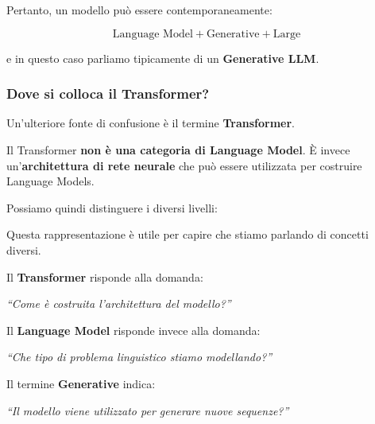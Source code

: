Pertanto, un modello può essere contemporaneamente:

\begin{equation}
\boxed{
\text{Language Model}
+
\text{Generative}
+
\text{Large}
}
\end{equation}

e in questo caso parliamo tipicamente di un \textbf{Generative LLM}.

\subsubsection{Dove si colloca il Transformer?}

Un'ulteriore fonte di confusione è il termine \textbf{Transformer}.

Il Transformer \textbf{non è una categoria di Language Model}. È invece un'\textbf{architettura di rete neurale} che può essere utilizzata per costruire Language Models.

Possiamo quindi distinguere i diversi livelli:

\begin{center}
\end{center}

Questa rappresentazione è utile per capire che stiamo parlando di concetti diversi.

Il \textbf{Transformer} risponde alla domanda:

\begin{center}
\textit{``Come è costruita l'architettura del modello?''}
\end{center}

Il \textbf{Language Model} risponde invece alla domanda:

\begin{center}
\textit{``Che tipo di problema linguistico stiamo modellando?''}
\end{center}

Il termine \textbf{Generative} indica:

\begin{center}
\textit{``Il modello viene utilizzato per generare nuove sequenze?''}
\end{center}

